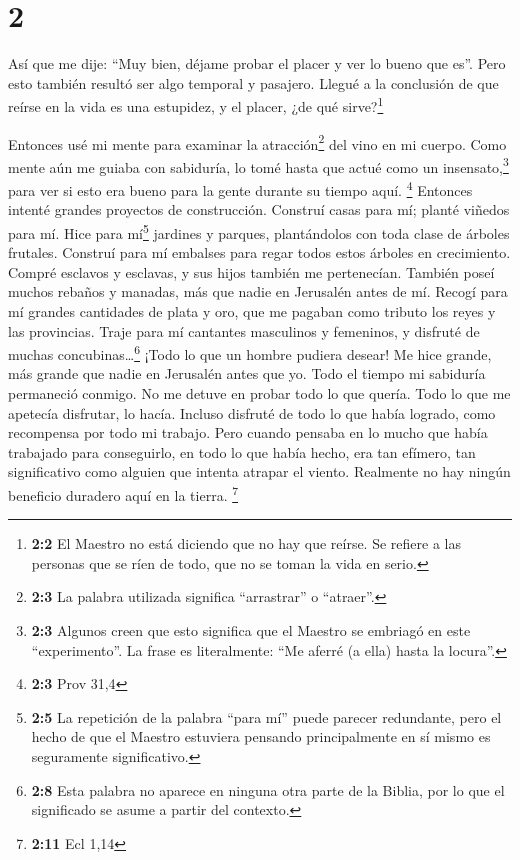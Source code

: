 \hypertarget{section-1}{%
\section{2}\label{section-1}}

 Así que me dije: ``Muy bien, déjame probar el placer y
ver lo bueno que es''. Pero esto también resultó ser algo temporal y
pasajero.  Llegué a la conclusión de que reírse en la vida
es una estupidez, y el placer, ¿de qué sirve?\footnote{\textbf{2:2} El
  Maestro no está diciendo que no hay que reírse. Se refiere a las
  personas que se ríen de todo, que no se toman la vida en serio.}

 Entonces usé mi mente para examinar la
atracción\footnote{\textbf{2:3} La palabra utilizada significa
  ``arrastrar'' o ``atraer''.} del vino en mi cuerpo. Como mente aún me
guiaba con sabiduría, lo tomé hasta que actué como un
insensato,\footnote{\textbf{2:3} Algunos creen que esto significa que el
  Maestro se embriagó en este ``experimento''. La frase es literalmente:
  ``Me aferré (a ella) hasta la locura''.} para ver si esto era bueno
para la gente durante su tiempo aquí. \footnote{\textbf{2:3} Prov 31,4}
 Entonces intenté grandes proyectos de construcción.
Construí casas para mí; planté viñedos para mí.  Hice para
mí\footnote{\textbf{2:5} La repetición de la palabra ``para mí'' puede
  parecer redundante, pero el hecho de que el Maestro estuviera pensando
  principalmente en sí mismo es seguramente significativo.} jardines y
parques, plantándolos con toda clase de árboles frutales. 
Construí para mí embalses para regar todos estos árboles en crecimiento.
 Compré esclavos y esclavas, y sus hijos también me
pertenecían. También poseí muchos rebaños y manadas, más que nadie en
Jerusalén antes de mí.  Recogí para mí grandes cantidades
de plata y oro, que me pagaban como tributo los reyes y las provincias.
Traje para mí cantantes masculinos y femeninos, y disfruté de muchas
concubinas\ldots{}\footnote{\textbf{2:8} Esta palabra no aparece en
  ninguna otra parte de la Biblia, por lo que el significado se asume a
  partir del contexto.} ¡Todo lo que un hombre pudiera desear!
 Me hice grande, más grande que nadie en Jerusalén antes
que yo. Todo el tiempo mi sabiduría permaneció conmigo. 
No me detuve en probar todo lo que quería. Todo lo que me apetecía
disfrutar, lo hacía. Incluso disfruté de todo lo que había logrado, como
recompensa por todo mi trabajo.  Pero cuando pensaba en
lo mucho que había trabajado para conseguirlo, en todo lo que había
hecho, era tan efímero, tan significativo como alguien que intenta
atrapar el viento. Realmente no hay ningún beneficio duradero aquí en la
tierra. \footnote{\textbf{2:11} Ecl 1,14}

